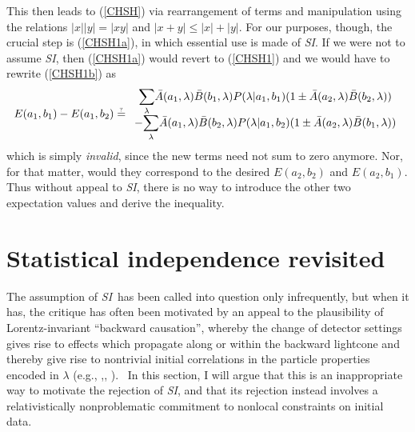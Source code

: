 \documentclass[12pt]{article}%
\begin{document}
This then leads to (\ref{CHSH}) via rearrangement of terms and manipulation
using the relations $\left\vert x\right\vert \left\vert y\right\vert
=\left\vert xy\right\vert $ and $\left\vert x+y\right\vert \leq\left\vert
x\right\vert +\left\vert y\right\vert $. For our purposes, though, the crucial
step is (\ref{CHSH1a}), in which essential use is made of \emph{SI}. If we
were not to assume \emph{SI}, then (\ref{CHSH1a}) would revert to
(\ref{CHSH1}) and we would have to rewrite (\ref{CHSH1b}) as
\begin{equation}
E(a_{1},b_{1})-E(a_{1},b_{2})%
\stackrel{_?}{=}%
\begin{array}
[c]{c}%
{\displaystyle\sum\limits_{\lambda}}
\bar{A}(a_{1},\lambda)\bar{B}(b_{1},\lambda)P(\lambda|a_{1},b_{1})(1\pm\bar
{A}(a_{2},\lambda)\bar{B}(b_{2},\lambda))\\
-%
{\displaystyle\sum\limits_{\lambda}}
\bar{A}(a_{1},\lambda)\bar{B}(b_{2},\lambda)P(\lambda|a_{1},b_{2})(1\pm\bar
{A}(a_{2},\lambda)\bar{B}(b_{1},\lambda))
\end{array}
\label{CHSH2b}%
\end{equation}
which is simply \emph{invalid}, since the new terms need not sum to zero
anymore. Nor, for that matter, would they correspond to the desired
$E(a_{2},b_{2})$ and $E(a_{2},b_{1})$. Thus without appeal to \emph{SI}, there
is no way to introduce the other two expectation values and derive the inequality.

\section{Statistical independence revisited}

The assumption of \emph{SI}\ has been called into question only infrequently,
but when it has, the critique has often been motivated by an appeal to the
plausibility of Lorentz-invariant \textquotedblleft backward
causation\textquotedblright, whereby the change of detector settings gives
rise to effects which propagate along or within the backward lightcone and
thereby give rise to nontrivial initial correlations in the particle
properties encoded in $\lambda$ (e.g., \cite{Cos78},\cite{Suth83},
\cite{Pri96}). \ In this section, I will argue that this is an inappropriate
way to motivate the rejection of \emph{SI}, and that its rejection instead
involves a relativistically nonproblematic commitment to nonlocal constraints
on initial data.
\end{document}

